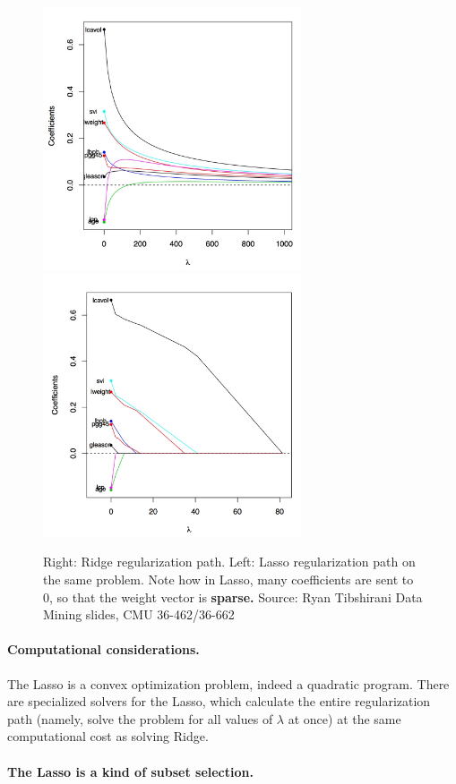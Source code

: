 \begin{figure}[H]
      \centering
      \includegraphics[width=3in]{ridge_path.jpeg}
      \,\,
      \includegraphics[width=3in]{lasso_path.jpeg}
      \caption{Right: Ridge regularization path. 
        Left: Lasso regularization path on the same problem. 
        Note how in Lasso, many
        coefficients are sent to $0$, so that the weight vector is {\bf sparse.}
        Source: Ryan Tibshirani Data Mining slides, CMU 36-462/36-662 }
    \end{figure}


\paragraph{Computational considerations.}
The Lasso is a convex optimization problem, indeed a quadratic program. There
are specialized solvers for the Lasso, which calculate the entire regularization
path (namely, solve the problem for all values of $\lambda$ at once) at the same
computational cost as solving Ridge. 

\paragraph{The Lasso is a kind of subset selection.}

